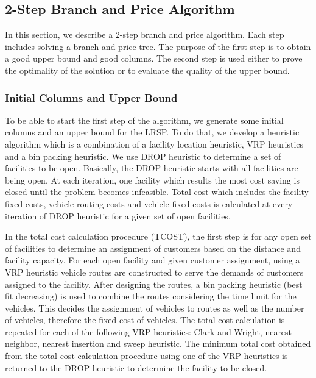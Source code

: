 
\subsection {2-Step Branch and Price Algorithm}    
\label{sec:2SBPAlgorithm}
In this section, we describe a 2-step branch and price algorithm. Each
step includes solving a branch and price tree. The purpose of the first step is to 
obtain a good upper bound and good columns. The second step is used either to
prove the optimality of the solution or to evaluate the quality of the upper bound. 


  
\subsubsection{Initial Columns and Upper Bound}

To be able to start the first step of the algorithm, we generate some initial columns 
and an upper bound for the LRSP. To do that, we develop a heuristic algorithm 
which is a combination of a facility location heuristic, VRP heuristics 
and a bin packing heuristic. We use DROP heuristic to determine a set of facilities 
to be open. Basically, the DROP heuristic starts with all facilities are being open. 
At each iteration, one facility which results the most cost saving is closed until
the problem becomes infeasible. Total cost which includes the facility fixed 
costs, vehicle routing costs and vehicle fixed costs is calculated at every 
iteration of DROP heuristic for a given set of open facilities. 

In the total cost calculation procedure (TCOST), the first step is for any open set of facilities 
to determine an assignment of customers based on the distance and facility capacity. 
For each open facility and given customer assignment, using a VRP 
heuristic vehicle routes are constructed to serve the demands of customers assigned to
the facility. After designing the routes, a bin packing heuristic (best fit decreasing)
is used to combine the routes considering the time limit for the vehicles. This
decides the assignment of vehicles to routes as well as the number of vehicles, 
therefore the fixed cost of vehicles. The total cost calculation is repeated for each 
of the following VRP heuristics: Clark and Wright, nearest neighbor, nearest insertion 
and sweep heuristic. The minimum total cost obtained from the total cost calculation
procedure using one of the VRP heuristics is returned to the DROP heuristic to 
determine the facility to be closed. 

